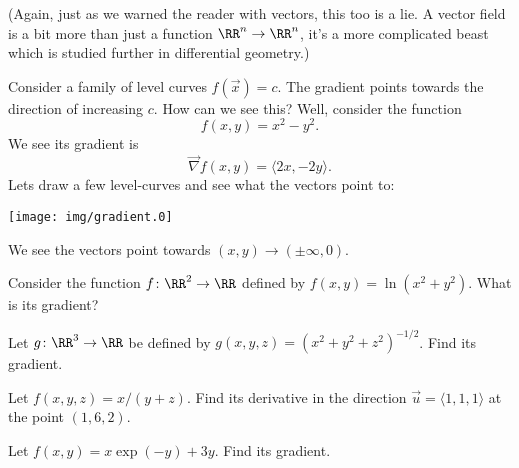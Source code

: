 (Again, just as we warned the reader with vectors, this too is a
lie. A vector field is a bit more than just a function
$\RR^{n}\to\RR^{n}$, it's a more complicated beast which is
studied further in differential geometry.)

Consider a family of level curves $f(\vec{x})=c$. The gradient
points towards the direction of increasing $c$. How can we see
this? Well, consider the function
\begin{equation}
f(x,y)=x^{2}-y^{2}.
\end{equation}
We see its gradient is
\begin{equation}
\vec{\nabla}f(x,y) = \langle 2x, -2y\rangle.
\end{equation}
Lets draw a few level-curves and see what the vectors point to:
\begin{center}
\texttt{[image: img/gradient.0]}
\end{center}
We see the vectors point towards $(x,y)\to(\pm\infty,0)$. 

\begin{exercise}
Consider the function $f\colon\RR^{2}\to\RR$ defined by
$f(x,y)=\ln(x^{2}+y^{2})$. What is its gradient?
\end{exercise}
\begin{exercise}
Let $g\colon\RR^{3}\to\RR$ be defined by $g(x,y,z) =
(x^{2}+y^{2}+z^{2})^{-1/2}$. Find its gradient.
\end{exercise}
\begin{exercise}
Let $f(x,y,z)=x/(y+z)$. Find its derivative in the direction
$\vec{u}=\langle 1,1,1\rangle$ at the point $(1,6,2)$. 
\end{exercise}
\begin{exercise}
Let $f(x,y)=x\exp(-y) + 3y$. Find its gradient.
\end{exercise}
